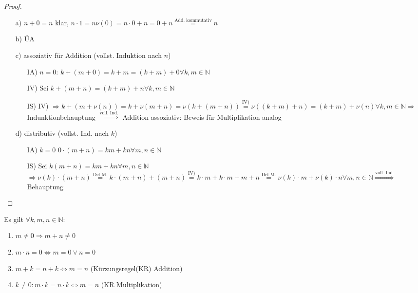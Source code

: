 \begin{proof}
	\begin{itemize}
		\item[a)] $n+0 = n$ klar, $n \cdot 1 = n\nu(0) = n \cdot 0 + n = 0 + n \overset{\text{Add. kommutativ}}{=} n$
		\item[b)] ÜA
		\item[c)] assoziativ für Addition (vollst. Induktion nach $n$)
		\begin{itemize}
			\item[IA)] $n=0$: $k+(m+0) = k + m = (k+m)+0 \forall k,m \in \mathbb{N}$
			\item[IV)] Sei $k+(m+n) = (k+m)+n \forall k,m \in \mathbb{N}$
			\item[IS)] 
				IV) $\Rightarrow k + (m + \nu(n)) = k+\nu(m+n) =\nu(k+(m+n)) \overset{\text{IV)}}{=} \nu((k+m)+n)
				=(k+m)+\nu(n) \forall k,m \in \mathbb{N}
				\Rightarrow$ Indunktionbehauptung
			$\overset{\text{voll. Ind.}}{\Rightarrow}$ Addition assoziativ: Beweis für Multiplikation analog
		\end{itemize}
		\item[d)] distributiv (vollst. Ind. nach $k$)
			\begin{itemize}
				\item[IA)] $k=0$ $0\cdot(m+n) = km + kn \forall m,n \in \mathbb{N}$
				\item[IS)] Sei $k(m+n) = km + kn \forall m,n \in \mathbb{N}$
				$\Rightarrow \nu(k)\cdot (m+n) \overset{\text{Def M.}}{=} k \cdot (m+n) + (m+n) \overset{\text{IV)}}{=}k\cdot m + k \cdot m + m+n \overset{\text{Def M.}}{=} \nu(k)\cdot m + \nu(k)\cdot n \forall m,n \in \mathbb{N} \overset{\text{voll. Ind.}}{\Rightarrow}$ Behauptung
			\end{itemize}
	\end{itemize}
\end{proof}

\begin{conclusion}
	Es gilt $\forall k,m,n\in\mathbb{N}$:
	\begin{enumerate}[label={\alph*)}]
		\item $m\neq 0 \Rightarrow m+n \neq 0$
		\item $m\cdot n = 0 \Leftrightarrow m = 0 \lor n = 0$
		\item $m + k = n + k \Leftrightarrow m = n$ (Kürzungsregel(KR) Addition)
		\item $k\neq 0: m\cdot k = n\cdot k \Leftrightarrow m = n$ (KR Multiplikation)
	\end{enumerate}
\end{conclusion}

